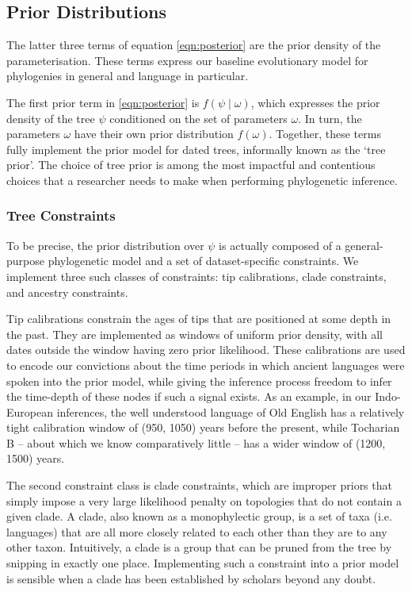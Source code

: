 \documentclass[10pt,journal,compsoc]{IEEEtran}
\begin{document}
\subsection{Prior Distributions}

The latter three terms of equation \eqref{eqn:posterior} are the prior density of the parameterisation. These terms express our baseline evolutionary model for phylogenies in general and language in particular.

The first prior term in \eqref{eqn:posterior} is $f(\psi\;|\;\omega)$, which expresses the prior density of the tree $\psi$ conditioned on the set of parameters $\omega$. In turn, the parameters $\omega$ have their own prior distribution $f(\omega)$. Together, these terms fully implement the prior model for dated trees, informally known as the `tree prior'. The choice of tree prior is among the most impactful and contentious choices that a researcher needs to make when performing phylogenetic inference.

\subsubsection{Tree Constraints}

To be precise, the prior distribution over $\psi$ is actually composed of a general-purpose phylogenetic model and a set of dataset-specific constraints. We implement three such classes of constraints: tip calibrations, clade constraints, and ancestry constraints.

Tip calibrations constrain the ages of tips that are positioned at some depth in the past. They are implemented as windows of uniform prior density, with all dates outside the window having zero prior likelihood. These calibrations are used to encode our convictions about the time periods in which ancient languages were spoken into the prior model, while giving the inference process freedom to infer the time-depth of these nodes if such a signal exists. As an example, in our Indo-European inferences, the well understood language of Old English has a relatively tight calibration window of (950, 1050) years before the present, while Tocharian B -- about which we know comparatively little -- has a wider window of (1200, 1500) years.

The second constraint class is clade constraints, which are improper priors that simply impose a very large likelihood penalty on topologies that do not contain a given clade. A clade, also known as a monophylectic group, is a set of taxa (i.e. languages) that are all more closely related to each other than they are to any other taxon. Intuitively, a clade is a group that can be pruned from the tree by snipping in exactly one place. Implementing such a constraint into a prior model is sensible when a clade has been established by scholars beyond any doubt.
\end{document}
